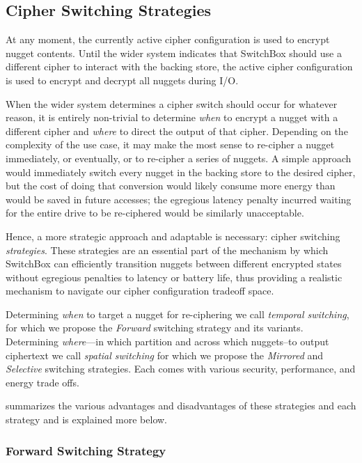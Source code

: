 \subsection{Cipher Switching Strategies}

At any moment, the currently active cipher configuration is used to encrypt
nugget contents. Until the wider system indicates that SwitchBox should use a
different cipher to interact with the backing store, the active cipher
configuration is used to encrypt and decrypt all nuggets during I/O.

When the wider system determines a cipher switch should occur for whatever
reason, it is entirely non-trivial to determine \emph{when} to encrypt a nugget
with a different cipher and \emph{where} to direct the output of that cipher.
Depending on the complexity of the use case, it may make the most sense to
re-cipher a nugget immediately, or eventually, or to re-cipher a series of
nuggets. A simple approach would immediately switch every nugget in the backing
store to the desired cipher, but the cost of doing that conversion would likely
consume more energy than would be saved in future accesses; the egregious
latency penalty incurred waiting for the entire drive to be re-ciphered would be
similarly unacceptable.

Hence, a more strategic approach and adaptable is necessary: cipher switching
\emph{strategies}. These strategies are an essential part of the mechanism by
which SwitchBox can efficiently transition nuggets between different encrypted
states without egregious penalties to latency or battery life, thus providing a
realistic mechanism to navigate our cipher configuration tradeoff space.

Determining \emph{when} to target a nugget for re-ciphering we call
\emph{temporal switching}, for which we propose the \emph{Forward} switching
strategy and its variants. Determining \emph{where}---in which partition and
across which nuggets--to output ciphertext we call \emph{spatial switching} for
which we propose the \emph{Mirrored} and \emph{Selective} switching strategies.
Each comes with various security, performance, and energy trade offs.

 summarizes the various advantages and
disadvantages of these strategies and each strategy and is explained more below.

\subsubsection{Forward Switching Strategy}


